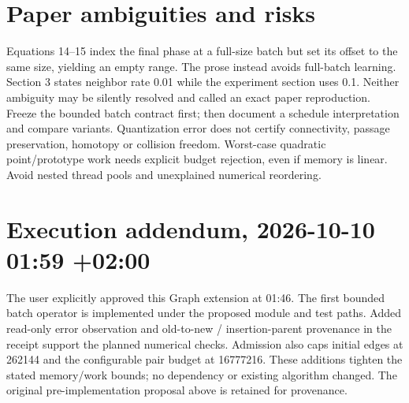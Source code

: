 \documentclass{article}
\begin{document}
\section*{Paper ambiguities and risks}
Equations 14--15 index the final phase at a full-size batch but set its offset
to the same size, yielding an empty range. The prose instead avoids full-batch
learning. Section 3 states neighbor rate 0.01 while the experiment section uses
0.1. Neither ambiguity may be silently resolved and called an exact paper
reproduction. Freeze the bounded batch contract first; then document a schedule
interpretation and compare variants. Quantization error does not certify
connectivity, passage preservation, homotopy or collision freedom. Worst-case
quadratic point/prototype work needs explicit budget rejection, even if memory
is linear. Avoid nested thread pools and unexplained numerical reordering.
\section*{Execution addendum, 2026-10-10 01:59 +02:00}
The user explicitly approved this Graph extension at 01:46. The first bounded
batch operator is implemented under the proposed module and test paths. Added
read-only error observation and old-to-new / insertion-parent provenance in the
receipt support the planned numerical checks. Admission also caps initial edges
at 262144 and the configurable pair budget at 16777216. These additions tighten
the stated memory/work bounds; no dependency or existing algorithm changed.
The original pre-implementation proposal above is retained for provenance.
\end{document}
